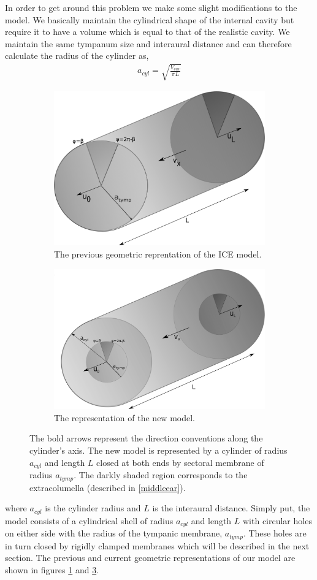 In order to get around this problem we make some slight modifications to the model. We basically maintain the cylindrical shape of the internal 
cavity but require it to have a volume which is equal to that of the realistic cavity. We maintain the same tympanum size and interaural distance
and can therefore calculate the radius of the cylinder as,
\begin{align}
 a_{cyl}=\sqrt{\frac{V_{cav}}{\pi L}}
\end{align}
\begin{figure}[ht!]
\begin{center}
\begin{subfigure}{1.0\textwidth}
 \centering
  \includegraphics[width=.5\linewidth]{Diagrams/oldCylinder.png}
   \caption[Previous ICE Model Cylinder]{The previous geometric reprentation of the ICE model.}
  \label{oldICE}
\end{subfigure}

\begin{subfigure}{1.0\textwidth}
\centering
  \includegraphics[width=.5\linewidth]{Diagrams/newCylinder.png}
  \caption[New ICE Model Cylinder]{The representation of the new model.}
  \label{newICE}
  \end{subfigure}
  \caption[Previous and current ICE model representations]{The bold arrows represent the direction conventions
  along the cylinder's axis. The new model is represented by a cylinder of radius $a_{cyl}$ and length $L$ closed
  at both ends by sectoral membrane of radius $a_{tymp}$.
  The darkly shaded region corresponds to the extracolumella (described in \ref{middleear}).}
\end{center}
\end{figure}
where $a_{cyl}$ is the cylinder radius and $L$ is the interaural distance. Simply put, the model consists of a cylindrical shell
of radius $a_{cyl}$ and length $L$ with circular holes on either side with the radius of the tympanic membrane, $a_{tymp}$. These
holes are in turn closed by rigidly clamped membranes which will be described in the next section. The previous and current geometric representations
of our model are shown in figures \ref{oldICE} and \ref{newICE}.


